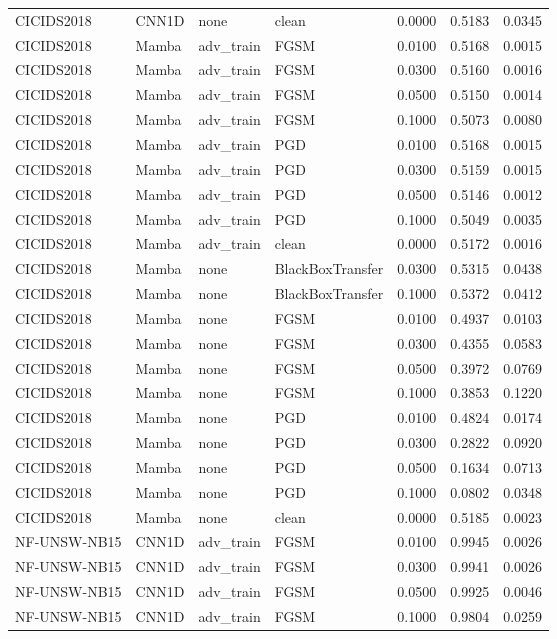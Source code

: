 \begin{table}[ht]
\begin{tabular}{llllrrr}
CICIDS2018 & CNN1D & none & clean & 0.0000 & 0.5183 & 0.0345 \\
CICIDS2018 & Mamba & adv\_train & FGSM & 0.0100 & 0.5168 & 0.0015 \\
CICIDS2018 & Mamba & adv\_train & FGSM & 0.0300 & 0.5160 & 0.0016 \\
CICIDS2018 & Mamba & adv\_train & FGSM & 0.0500 & 0.5150 & 0.0014 \\
CICIDS2018 & Mamba & adv\_train & FGSM & 0.1000 & 0.5073 & 0.0080 \\
CICIDS2018 & Mamba & adv\_train & PGD & 0.0100 & 0.5168 & 0.0015 \\
CICIDS2018 & Mamba & adv\_train & PGD & 0.0300 & 0.5159 & 0.0015 \\
CICIDS2018 & Mamba & adv\_train & PGD & 0.0500 & 0.5146 & 0.0012 \\
CICIDS2018 & Mamba & adv\_train & PGD & 0.1000 & 0.5049 & 0.0035 \\
CICIDS2018 & Mamba & adv\_train & clean & 0.0000 & 0.5172 & 0.0016 \\
CICIDS2018 & Mamba & none & BlackBoxTransfer & 0.0300 & 0.5315 & 0.0438 \\
CICIDS2018 & Mamba & none & BlackBoxTransfer & 0.1000 & 0.5372 & 0.0412 \\
CICIDS2018 & Mamba & none & FGSM & 0.0100 & 0.4937 & 0.0103 \\
CICIDS2018 & Mamba & none & FGSM & 0.0300 & 0.4355 & 0.0583 \\
CICIDS2018 & Mamba & none & FGSM & 0.0500 & 0.3972 & 0.0769 \\
CICIDS2018 & Mamba & none & FGSM & 0.1000 & 0.3853 & 0.1220 \\
CICIDS2018 & Mamba & none & PGD & 0.0100 & 0.4824 & 0.0174 \\
CICIDS2018 & Mamba & none & PGD & 0.0300 & 0.2822 & 0.0920 \\
CICIDS2018 & Mamba & none & PGD & 0.0500 & 0.1634 & 0.0713 \\
CICIDS2018 & Mamba & none & PGD & 0.1000 & 0.0802 & 0.0348 \\
CICIDS2018 & Mamba & none & clean & 0.0000 & 0.5185 & 0.0023 \\
NF-UNSW-NB15 & CNN1D & adv\_train & FGSM & 0.0100 & 0.9945 & 0.0026 \\
NF-UNSW-NB15 & CNN1D & adv\_train & FGSM & 0.0300 & 0.9941 & 0.0026 \\
NF-UNSW-NB15 & CNN1D & adv\_train & FGSM & 0.0500 & 0.9925 & 0.0046 \\
NF-UNSW-NB15 & CNN1D & adv\_train & FGSM & 0.1000 & 0.9804 & 0.0259 \\

\end{tabular}
\end{table}

